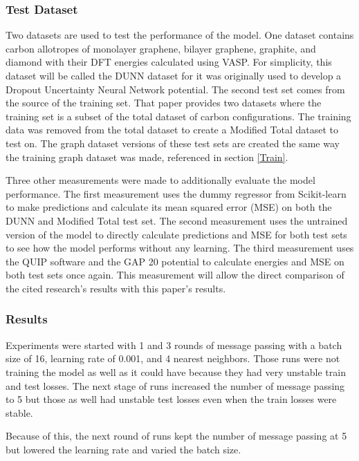 \documentclass[12pt, abstract = true]{scrartcl}
\begin{document}
\subsubsection{Test Dataset} 
Two datasets are used to test the performance of the model. One dataset contains carbon allotropes of monolayer graphene, bilayer graphene, graphite, and diamond with their DFT energies calculated using VASP. For simplicity, this dataset will be called the DUNN dataset for it was originally used to develop a Dropout Uncertainty Neural Network potential\cite{dunn}. The second test set comes from the source of the training set. That paper\cite{gap20} provides two datasets where the training set is a subset of the total dataset of carbon configurations. The training data was removed from the total dataset to create a Modified Total dataset to test on. The graph dataset versions of these test sets are created the same way the training graph dataset was made, referenced in section \ref{Train}. 

Three other measurements were made to additionally evaluate the model performance. The first measurement uses the dummy regressor from Scikit-learn to make predictions and calculate its mean squared error (MSE) on both the DUNN and Modified Total test set. The second measurement uses the untrained version of the model to directly calculate predictions and MSE for both test sets to see how the model performs without any learning. The third measurement uses the QUIP software and the GAP 20 potential\cite{gap20} to calculate energies and MSE on both test sets once again. This measurement will allow the direct comparison of the cited research's results with this paper's results.

\subsubsection{Results} 
Experiments were started with 1 and 3 rounds of message passing with a batch size of 16, learning rate of 0.001, and 4 nearest neighbors. Those runs were not training the model as well as it could have because they had very unstable train and test losses. The next stage of runs increased the number of message passing to 5 but those as well had unstable test losses even when the train losses were stable. 


Because of this, the next round of runs kept the number of message passing at 5 but lowered the learning rate and varied the batch size. 
\end{document}
